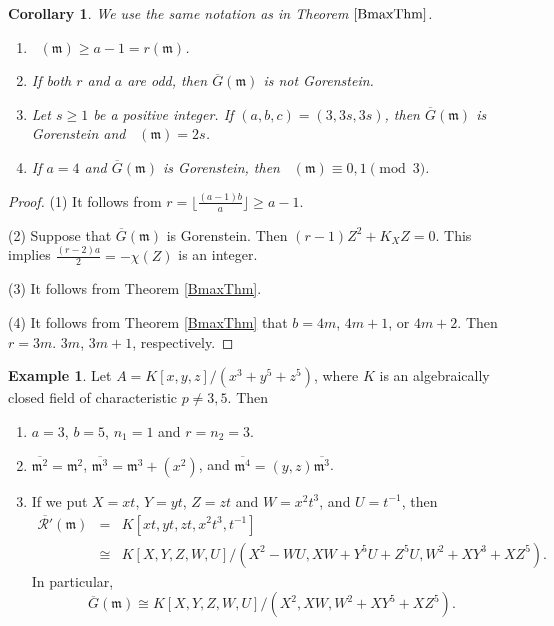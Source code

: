 \documentclass[12pt]{amsart}
\newtheorem{cor}[thm]{Corollary}
\theoremstyle{definition}
\newtheorem{exam}[thm]{Example}
\theoremstyle{remark}
\numberwithin{equation}{section}
\DeclareMathOperator{\br}{\bar r}
\newcommand{\m}{\mathfrak m}
\renewcommand{\:}{\colon}
\newcommand{\ol}[1]{\overline {#1}}
\begin{document}
\begin{cor} \label{cor: Bries-ex}
We use the same notation as in Theorem $\ref{BmaxThm}$. 
\begin{enumerate}
\item $\br(\m) \ge a-1=r(\m)$.  
\item If both $r$ and $a$ are odd, 
then  $\overline{G}(\m)$ is not Gorenstein. 
\item Let $s \ge 1$ be a positive integer. 
If $(a,b,c)=(3,3s,3s)$, then  
$\overline{G}(\m)$ is Gorenstein and $\br(\m)=2s$.  
\item If $a=4$ and $\overline{G}(\m)$ is Gorenstein, then 
$\br(\m) \equiv 0,1 \pmod{3}$. 
\end{enumerate}
\end{cor}

\begin{proof}
(1) It follows from $r = \lfloor \frac{(a-1)b}{a} \rfloor \ge a-1$. 
 \par \vspace{2mm} \par \noindent 
(2) Suppose that $\ol G(\m)$ is Gorenstein. 
Then $(r-1)Z^2 + K_XZ=0$. This implies $\frac{(r-2)a}{2}=-\chi(Z)$ is an integer. 
\par \vspace{2mm} \par \noindent 
(3)  It follows from Theorem \ref{BmaxThm}. 
\par \vspace{2mm} \par \noindent 
(4) It follows from Theorem \ref{BmaxThm} that $b=4m$, $4m+1$, or 
$4m+2$. 
Then $r=3m$. $3m$, $3m+1$, respectively. 
\end{proof}


\begin{exam}
Let $A=K[x,y,z]/(x^3+y^5+z^5)$, where $K$ is an algebraically closed field of characteristic $p \ne 3,5$. Then 
\begin{enumerate}
\item $a=3$, $b=5$, $n_1=1$ and $r=n_2=3$. 
\item $\overline{\m^2}=\m^2$, $\overline{\m^3}=\m^3+(x^2)$, 
and $\overline{\m^4}=(y,z)\overline{\m^3}$. 
\item If we put $X=xt$, $Y=yt$, $Z=zt$ and $W=x^2t^3$, and $U=t^{-1}$, 
then 
\begin{eqnarray*}
\overline{\mathcal{R}'}(\m) \!\!\!\!
&=& \!\!\!\! K[xt,yt,zt,x^2t^3,t^{-1}] \\[1mm]
&\cong &  \!\!\!\! 
K[X,Y,Z,W,U]/(X^2-WU, XW+Y^5U+Z^5U, W^2+XY^3+XZ^5). 
\end{eqnarray*}
In particular, 
\[
\overline{G}(\m) 
\cong K[X,Y,Z,W,U]/(X^2, XW, W^2+XY^5+XZ^5). 
\]
\end{enumerate} 
\end{exam}
\end{document}
